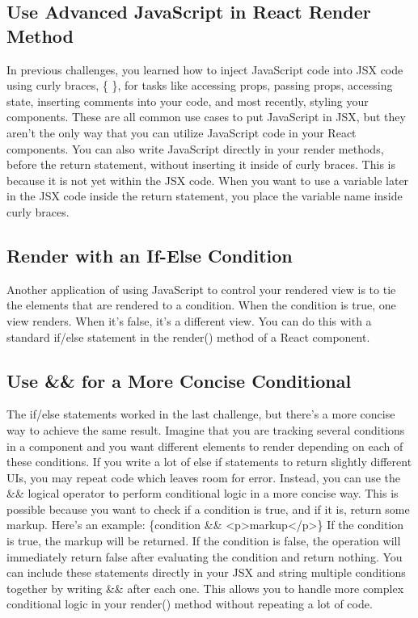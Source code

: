 \documentclass{article}%
\begin{document}
%
\subsection{Use Advanced JavaScript in React Render Method}%
\label{subsec:UseAdvancedJavaScriptinReactRenderMethod}%
In previous challenges, you learned how to inject JavaScript code into JSX code using curly braces, \{ \}, for tasks like accessing props, passing props, accessing state, inserting comments into your code, and most recently, styling your components. These are all common use cases to put JavaScript in JSX, but they aren't the only way that you can utilize JavaScript code in your React components.\newline%
You can also write JavaScript directly in your render methods, before the return statement, without inserting it inside of curly braces. This is because it is not yet within the JSX code. When you want to use a variable later in the JSX code inside the return statement, you place the variable name inside curly braces.\newline%

%
\subsection{Render with an If{-}Else Condition}%
\label{subsec:RenderwithanIf{-}ElseCondition}%
Another application of using JavaScript to control your rendered view is to tie the elements that are rendered to a condition. When the condition is true, one view renders. When it's false, it's a different view. You can do this with a standard if/else statement in the render() method of a React component.\newline%

%
\subsection{Use \&\& for a More Concise Conditional}%
\label{subsec:UseforaMoreConciseConditional}%
The if/else statements worked in the last challenge, but there's a more concise way to achieve the same result. Imagine that you are tracking several conditions in a component and you want different elements to render depending on each of these conditions. If you write a lot of else if statements to return slightly different UIs, you may repeat code which leaves room for error. Instead, you can use the \&\& logical operator to perform conditional logic in a more concise way. This is possible because you want to check if a condition is true, and if it is, return some markup. Here's an example:\newline%
\{condition \&\& <p>markup</p>\}\newline%
If the condition is true, the markup will be returned. If the condition is false, the operation will immediately return false after evaluating the condition and return nothing. You can include these statements directly in your JSX and string multiple conditions together by writing \&\& after each one. This allows you to handle more complex conditional logic in your render() method without repeating a lot of code.\newline%
\end{document}
